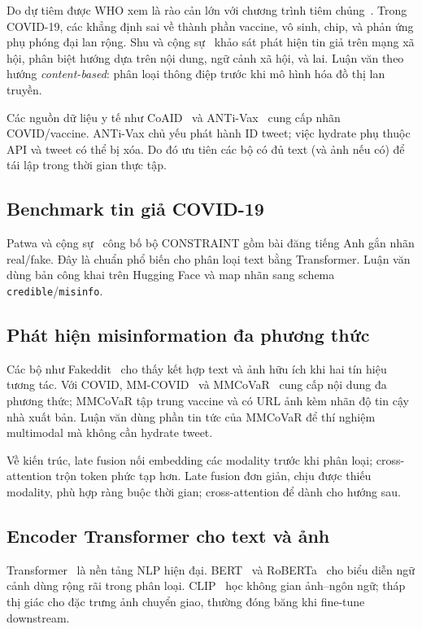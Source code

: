 \documentclass[12pt, a4paper]{report}
\begin{document}
Do dự tiêm được WHO xem là rào cản lớn với chương trình tiêm chủng~\cite{macdonald2015hesitancy}.
Trong COVID-19, các khẳng định sai về thành phần vaccine, vô sinh, chip, và phản ứng phụ phóng đại lan rộng.
Shu và cộng sự~\cite{shu2017fake} khảo sát phát hiện tin giả trên mạng xã hội, phân biệt hướng dựa trên nội dung, ngữ cảnh xã hội, và lai.
Luận văn theo hướng \emph{content-based}: phân loại thông điệp trước khi mô hình hóa đồ thị lan truyền.

Các nguồn dữ liệu y tế như CoAID~\cite{cui2020coaid} và ANTi-Vax~\cite{hayawi2022antivax} cung cấp nhãn COVID/vaccine.
ANTi-Vax chủ yếu phát hành ID tweet; việc hydrate phụ thuộc API và tweet có thể bị xóa.
Do đó ưu tiên các bộ có đủ text (và ảnh nếu có) để tái lập trong thời gian thực tập.

\subsection{Benchmark tin giả COVID-19}

Patwa và cộng sự~\cite{patwa2021fighting} công bố bộ CONSTRAINT gồm bài đăng tiếng Anh gắn nhãn real/fake.
Đây là chuẩn phổ biến cho phân loại text bằng Transformer.
Luận văn dùng bản công khai trên Hugging Face và map nhãn sang schema \texttt{credible}/\texttt{misinfo}.

\subsection{Phát hiện misinformation đa phương thức}

Các bộ như Fakeddit~\cite{nakamura2020fakeddit} cho thấy kết hợp text và ảnh hữu ích khi hai tín hiệu tương tác.
Với COVID, MM-COVID~\cite{li2020mmcovid} và MMCoVaR~\cite{chen2021mmcovar} cung cấp nội dung đa phương thức; MMCoVaR tập trung vaccine và có URL ảnh kèm nhãn độ tin cậy nhà xuất bản.
Luận văn dùng phần tin tức của MMCoVaR để thí nghiệm multimodal mà không cần hydrate tweet.

Về kiến trúc, late fusion nối embedding các modality trước khi phân loại; cross-attention trộn token phức tạp hơn.
Late fusion đơn giản, chịu được thiếu modality, phù hợp ràng buộc thời gian; cross-attention để dành cho hướng sau.

\subsection{Encoder Transformer cho text và ảnh}

Transformer~\cite{vaswani2017attention} là nền tảng NLP hiện đại.
BERT~\cite{devlin2019bert} và RoBERTa~\cite{liu2019roberta} cho biểu diễn ngữ cảnh dùng rộng rãi trong phân loại.
CLIP~\cite{radford2021clip} học không gian ảnh--ngôn ngữ; tháp thị giác cho đặc trưng ảnh chuyển giao, thường đóng băng khi fine-tune downstream.
\end{document}

